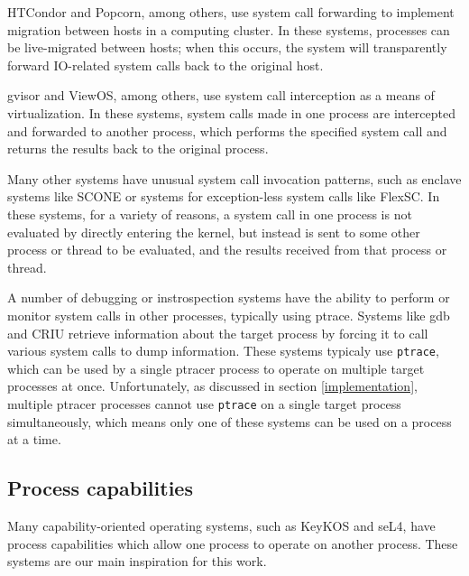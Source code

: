 \documentclass[letterpaper,twocolumn,10pt]{article}
\begin{document}
HTCondor\cite{condor} and Popcorn\cite{popcorn}, among others,
use system call forwarding to implement migration between hosts in a computing cluster.
In these systems, processes can be live-migrated between hosts;
when this occurs, the system will transparently forward IO-related system calls
back to the original host.

gvisor\cite{gvisor} and ViewOS\cite{viewos}, among others,
use system call interception as a means of virtualization.
In these systems,
system calls made in one process are intercepted and forwarded to another process,
which performs the specified system call and returns the results back to the original process.

Many other systems have unusual system call invocation patterns,
such as enclave systems like SCONE\cite{scone}\cite{eleos}
or systems for exception-less system calls like FlexSC\cite{flexsc}.
In these systems, for a variety of reasons,
a system call in one process is not evaluated by directly entering the kernel,
but instead is sent to some other process or thread to be evaluated,
and the results received from that process or thread.

A number of debugging or instrospection systems have the ability to perform or monitor system calls in other processes,
typically using ptrace.
Systems like gdb and CRIU
retrieve information about the target process by forcing it to call various system calls to dump information.
These systems typicaly use \texttt{ptrace},
which can be used by a single ptracer process to operate on multiple target processes at once.
Unfortunately, as discussed in section \ref{implementation},
multiple ptracer processes cannot use \texttt{ptrace} on a single target process simultaneously,
which means only one of these systems can be used on a process at a time.

\subsection{Process capabilities}
Many capability-oriented operating systems, such as KeyKOS and seL4,
have process capabilities which allow one process to operate on another process.\cite{keykos}\cite{sel4}\cite{fuchsia}
These systems are our main inspiration for this work.
\end{document}
